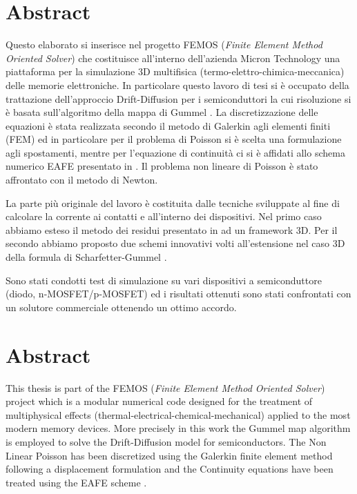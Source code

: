 \chapter*{Abstract}

Questo elaborato si inserisce nel progetto FEMOS (\textit{Finite Element Method Oriented Solver}) che costituisce all'interno dell'azienda Micron Technology una piattaforma per la simulazione 3D multifisica (termo-elettro-chimica-meccanica) delle memorie elettroniche.
In particolare questo lavoro di tesi si \`e occupato della trattazione dell'approccio Drift-Diffusion \cite{Jackson:ElettroClassica} per i semiconduttori la cui risoluzione si \`e basata sull'algoritmo della mappa di Gummel \cite{GummelMap}. La discretizzazione delle equazioni \`e stata realizzata secondo il metodo di Galerkin agli elementi finiti (FEM) ed in particolare per il problema di Poisson si \`e scelta una formulazione agli spostamenti, mentre per l'equazione di continuit\`a ci si \`e affidati allo schema numerico EAFE presentato in \cite{Zikatanov:EAFE1}. Il problema non lineare di Poisson \`e stato affrontato con il metodo di Newton.

La parte pi\`u originale del lavoro \`e costituita dalle tecniche sviluppate al fine di calcolare la corrente ai contatti e all'interno dei dispositivi. Nel primo caso abbiamo esteso il metodo dei residui  presentato in \cite{ContactCurrentRM} ad un framework 3D. Per il secondo abbiamo proposto due schemi innovativi volti all'estensione nel caso 3D della formula di Scharfetter-Gummel \cite{Gummel:SignAnalys}.

Sono stati condotti test di simulazione su vari dispositivi a semiconduttore (diodo, n-MOSFET/p-MOSFET) ed i risultati ottenuti sono stati confrontati con un solutore commerciale ottenendo un ottimo accordo.




\chapter*{Abstract}

This thesis is part of the FEMOS (\textit{Finite Element Method Oriented Solver}) project which is a modular numerical code designed for the treatment of multiphysical effects (thermal-electrical-chemical-mechanical) applied to the most modern memory devices.
More precisely in this work the Gummel map algorithm \cite{GummelMap} is employed to solve the Drift-Diffusion model  \cite{Jackson:ElettroClassica} for semiconductors. The Non Linear Poisson has been discretized using the Galerkin finite element method \cite{quarteroni:NumApprox} following a displacement formulation and the Continuity equations have been treated using the EAFE scheme \cite{Zikatanov:EAFE1}.

